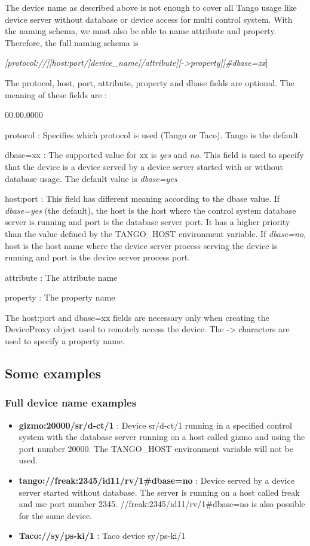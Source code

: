 The device name as described above is not enough to cover all Tango
usage like device server without database or device access for multi
control system. With the naming schema, we must also be able to name
attribute and property. Therefore, the full naming schema is\begin{center}\emph{{[}protocol://{]}{[}host:port/{]}device\_name{[}/attribute{]}{[}->property{]}{[}\#dbase=xx}]\end{center}The
protocol, host, port, attribute, property and dbase fields are optional.
The meaning of these fields are :
\begin{lyxlist}{00.00.0000}
\item [{protocol}] : Specifies which protocol is used (Tango or Taco).
Tango is the default
\item [{dbase=xx}] : The supported value for xx is \emph{yes} and \emph{no}.
This field is used to specify that the device is a device served by
a device server started with or without database usage. The default
value is \emph{dbase=yes}
\item [{host:port}] : This field has different meaning according to the
dbase value. If \emph{dbase=yes} (the default), the host is the host
where the control system database server is running and port is the
database server port. It has a higher priority than the value defined
by the TANGO\_HOST environment variable. If \emph{dbase=no}, host
is the host name where the device server process serving the device
is running and port is the device server process port.
\item [{attribute}] : The attribute name
\item [{property}] : The property name
\end{lyxlist}
The host:port and dbase=xx fields are necessary only when creating
the DeviceProxy object used to remotely access the device. The ->
characters are used to specify a property name.


\subsection{Some examples}


\subsubsection{Full device name examples}
\begin{itemize}
\item \textbf{gizmo:20000/sr/d-ct/1} : Device sr/d-ct/1 running in a specified
control system with the database server running on a host called gizmo
and using the port number 20000. The TANGO\_HOST environment variable
will not be used.
\item \textbf{tango://freak:2345/id11/rv/1\#dbase=no} : Device served by
a device server started without database. The server is running on
a host called freak and use port number 2345. //freak:2345/id11/rv/1\#dbase=no
is also possible for the same device.
\item \textbf{Taco://sy/ps-ki/1} : Taco device sy/ps-ki/1
\end{itemize}

